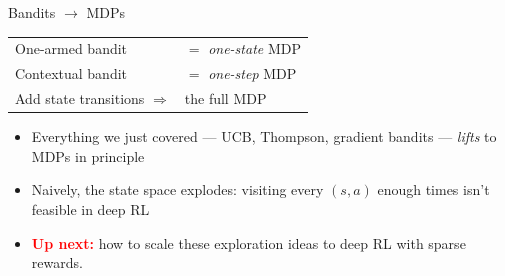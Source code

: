 \begin{frame}{Bandits $\longrightarrow$ MDPs}
\begin{center}
\renewcommand{\arraystretch}{1.5}
\large
\begin{tabular}{ll}
One-armed bandit     & $=$ \emph{one-state} MDP \\
Contextual bandit    & $=$ \emph{one-step} MDP \\
Add state transitions $\Longrightarrow$ & the full MDP \\
\end{tabular}
\end{center}
\vspace{0.8em}
\begin{itemize}
    \setlength{\itemsep}{0.5em}
    \item Everything we just covered --- UCB, Thompson, gradient bandits --- \emph{lifts} to MDPs in principle
    \item Naively, the state space explodes: visiting every $(s, a)$ enough times isn't feasible in deep RL
    \item \textcolor{red}{\textbf{Up next:}} how to scale these exploration ideas to deep RL with sparse rewards.
\end{itemize}
\end{frame}
